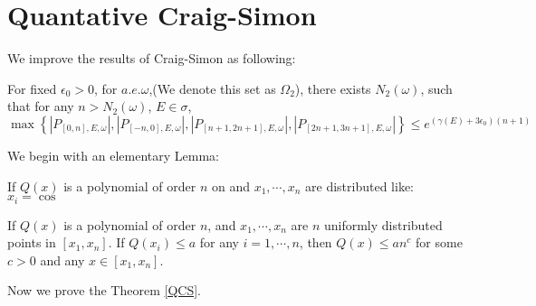 \section{Quantative Craig-Simon}
We improve the results of Craig-Simon as following:
\begin{thm}\label{QCS}
  For fixed $\epsilon_0>0$, for $a.e.\omega$,(We denote this set as $\Omega_2$), there exists $N_2(\omega)$, such that for any $n>N_2(\omega)$, $E\in \sigma$,
  \[
  \max\left\{|P_{[0,n],E,\omega}|,|P_{[-n,0],E,\omega}|,|P_{[n+1,2n+1],E,\omega}|,|P_{[2n+1,3n+1],E,\omega}|\right\}\leq e^{(\gamma(E)+3\epsilon_0)(n+1)}
  \]
\end{thm}

We begin with an elementary Lemma:
\begin{lemma}\label{elementary}
  If $Q(x)$ is a polynomial of order $n$ on and $x_1,\cdots,x_n$ are distributed like:
  $x_i=\cos$
\end{lemma}
\begin{lemma}
  If $Q(x)$ is a polynomial of order $n$, and $x_1,\cdots,x_n$ are $n$ uniformly distributed points in $[x_1,x_n]$. If $Q(x_i)\leq a$ for any $i=1,\cdots,n$, then $Q(x)\leq an^c$ for some $c>0$ and any $x\in[x_1,x_n]$.
\end{lemma}
Now we prove the Theorem \ref{QCS}.
